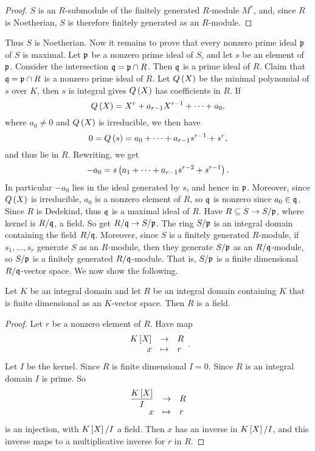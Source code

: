 \begin{proof}
$ S $ is an $ R $-submodule of the finitely generated $ R $-module $ M^* $, and, since $ R $ is Noetherian, $ S $ is therefore finitely generated as an $ R $-module.
\end{proof}

Thus $ S $ is Noetherian. Now it remains to prove that every nonzero prime ideal $ \pp $ of $ S $ is maximal. Let $ \pp $ be a nonzero prime ideal of $ S $, and let $ s $ be an element of $ \pp $. Consider the intersection $ \qq = \pp \cap R $. Then $ \qq $ is a prime ideal of $ R $. Claim that $ \qq = \pp \cap R $ is a nonzero prime ideal of $ R $. Let $ Q\rb{X} $ be the minimal polynomial of $ s $ over $ K $, then $ s $ is integral gives $ Q\rb{X} $ has coefficients in $ R $. If
$$ Q\rb{X} = X^r + a_{r - 1}X^{r - 1} + \dots + a_0, $$
where $ a_0 \ne 0 $ and $ Q\rb{X} $ is irreducible, we then have
$$ 0 = Q\rb{s} = a_0 + \dots + a_{r - 1}s^{r - 1} + s^r, $$
and thus lie in $ R $. Rewriting, we get
$$ -a_0 = s\rb{a_1 + \dots + a_{r - 1}s^{r - 2} + s^{r - 1}}. $$
In particular $ -a_0 $ lies in the ideal generated by $ s $, and hence in $ \pp $. Moreover, since $ Q\rb{X} $ is irreducible, $ a_0 $ is a nonzero element of $ R $, so $ \qq $ is nonzero since $ a_0 \in \qq $. Since $ R $ is Dedekind, thus $ \qq $ is a maximal ideal of $ R $. Have $ R \subseteq S \to S / \pp $, where kernel is $ R / \qq $, a field. So get $ R / \qq \to S / \pp $. The ring $ S / \pp $ is an integral domain containing the field $ R / \qq $. Moreover, since $ S $ is a finitely generated $ R $-module, if $ s_1, \dots, s_r $ generate $ S $ as an $ R $-module, then they generate $ S / \pp $ as an $ R / \qq $-module, so $ S / \pp $ is a finitely generated $ R / \qq $-module. That is, $ S / \pp $ is a finite dimensional $ R / \qq $-vector space. We now show the following.

\begin{lemma}
\label{lem:12.3.7}
Let $ K $ be an integral domain and let $ R $ be an integral domain containing $ K $ that is finite dimensional as an $ K $-vector space. Then $ R $ is a field.
\end{lemma}

\begin{proof}
Let $ r $ be a nonzero element of $ R $. Have map
$$ \function{K\sb{X}}{R}{x}{r}. $$
Let $ I $ be the kernel. Since $ R $ is finite dimensional $ I = 0 $. Since $ R $ is an integral domain $ I $ is prime. So
$$ \function{\dfrac{K\sb{X}}{I}}{R}{x}{r} $$
is an injection, with $ K\sb{X} / I $ a field. Then $ x $ has an inverse in $ K\sb{X} / I $, and this inverse maps to a multiplicative inverse for $ r $ in $ R $.
\end{proof}


